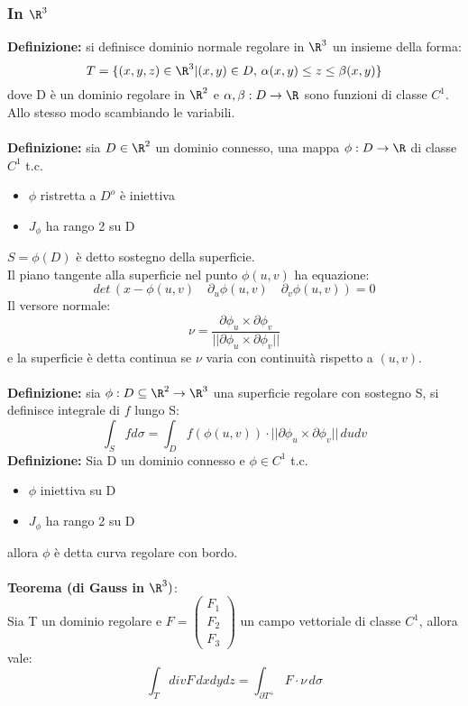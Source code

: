 \documentclass{article}
\begin{document}
\subsubsection{In $\R^3$}
\textbf{Definizione:} si definisce dominio normale regolare in $\R^3$ un insieme della forma:
$$ T=\{ (x,y,z)\in\R^3|(x,y)\in D,\,\alpha(x,y)\leq z\leq \beta(x,y) \} $$
dove D è un dominio regolare in $\R^2$ e $\alpha,\beta:D\rightarrow\R$ sono funzioni di classe $C^1$.\\
Allo stesso modo scambiando le variabili.\\\\
\textbf{Definizione:} sia $D\in\R^2$ un dominio connesso, una mappa $\phi:D\rightarrow\R$ di classe $C^1$ t.c.
\begin{itemize}
    \item $\phi$ ristretta a $D^o$ è iniettiva
    \item $J_\phi$ ha rango 2 su D
\end{itemize}
$S=\phi(D)$ è detto sostegno della superficie.\\
Il piano tangente alla superficie nel punto $\phi(u,v)$ ha equazione:
$$ det\,(x-\phi(u,v)\quad\partial_u\phi(u,v)\quad\partial_v\phi(u,v))=0 $$
Il versore normale:
$$ \nu=\frac{\partial\phi_u\times\partial\phi_v}{||\partial\phi_u\times\partial\phi_v||} $$
e la superficie è detta continua se $\nu$ varia con continuità rispetto a $(u,v)$.\\\\
\textbf{Definizione: } sia $\phi:D\subseteq\R^2\rightarrow\R^3$ una superficie regolare con sostegno S, si definisce integrale di $f$ lungo S:
$$ \int_Sfd\sigma=\int_Df(\phi(u,v))\cdot||\partial\phi_u\times\partial\phi_v||\,dudv $$
\textbf{Definizione:} Sia D un dominio connesso e $\phi\in C^1$ t.c.
\begin{itemize}
    \item $\phi$ iniettiva su D
    \item $J_\phi$ ha rango 2 su D
\end{itemize}
allora $\phi$ è detta curva regolare con bordo.\\\\
\textbf{Teorema (di Gauss in $\R^3)$}:\\
Sia T un dominio regolare e $F=\begin{pmatrix}F_1\\F_2\\F_3 \end{pmatrix}$ un campo vettoriale di classe $C^1$, allora vale:
$$ \int_TdivF\,dxdydz=\int_{\partial T^+}F\cdot\nu\,d\sigma $$
\end{document}
